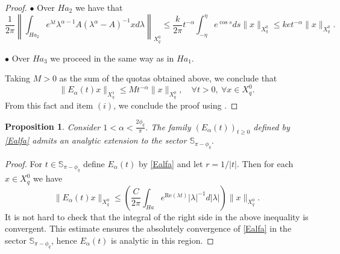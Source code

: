 \documentclass[12pt,reqno]{amsart}
\newtheorem{pr}{Proposition}
\begin{document}
\begin{proof}
		\noindent $\bullet$  Over $Ha_2$ we have that
		\begin{equation*}
			\frac{1}{2\pi}\left\|\int_{Ha_2}e^{\lambda t}\lambda^{\alpha-1} A(\lambda^{\alpha}-A)^{-1}xd\lambda\right\|_{X^{0}_{q}} \leq  \frac{k}{2\pi}t^{-\alpha}\int_{-\eta}^\eta e^{\cos s}ds \|x\|_{X^{0}_{q}}
			\leq  ket^{-\alpha}\|x\|_{X^{0}_{q}}.
		\end{equation*}
		
		\noindent $\bullet$  Over $Ha_3$ we proceed in the same way as in $Ha_1.$
		
Taking $M>0$ as the sum of the quotas obtained above, we conclude that
		$$\|E_{\alpha}(t)x\|_{X^{1}_{q}}\leq M t^{-\alpha}\|x\|_{X^{0}_{q}},\quad \forall t>0, \ \forall x\in X^{0}_{q}.$$
		From this fact and item $(i)$, we conclude the proof  using \cite[Theorem V.1.5.2]{Amann1}.
	\end{proof}
	
	\begin{pr}\label{analitic}
		Consider $1<\alpha<\frac{2\phi_q}{\pi}$. The family $(E_\alpha(t))_{t\ge0}$ defined by \eqref{Ealfa} admits an analytic extension to the sector $\mathbb{S}_{\pi-\phi_q}.$
	\end{pr}
	\begin{proof}
		For $t\in\mathbb{S}_{\pi-\phi_q}$ define $E_\alpha(t)$ by \eqref{Ealfa} and let $r=1/|t|.$ Then for each $x\in X^{0}_{q}$ we have
		\[\|E_\alpha(t)x\|_{X^{0}_{q}}\leq \left(\frac{C}{2\pi}\int_{Ha}e^{\mathrm{Re}(\lambda t)}|\lambda|^{-1}d|\lambda|\right)\|x\|_{X^{0}_{q}}.\]
		It is not hard to check that the integral of the right side in the above inequality is convergent. This estimate ensures the absolutely convergence of \eqref{Ealfa} in the sector $\mathbb{S}_{\pi-\phi_q}$, hence $E_\alpha(t)$ is analytic in this region.
	\end{proof}
	
	
	
\end{document}
